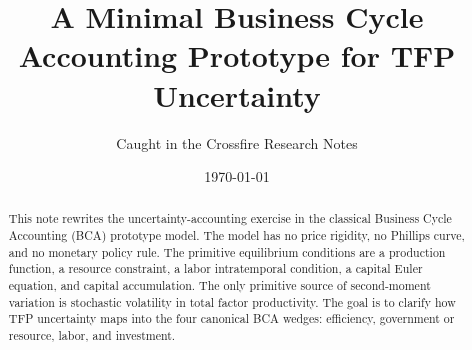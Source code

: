 \documentclass[11pt]{article}
\title{A Minimal Business Cycle Accounting Prototype for TFP Uncertainty}
\author{Caught in the Crossfire Research Notes}
\date{\today}
\begin{document}
\maketitle

\begin{abstract}
This note rewrites the uncertainty-accounting exercise in the classical
Business Cycle Accounting (BCA) prototype model. The model has no price
rigidity, no Phillips curve, and no monetary policy rule. The primitive
equilibrium conditions are a production function, a resource constraint, a
labor intratemporal condition, a capital Euler equation, and capital
accumulation. The only primitive source of second-moment variation is stochastic
volatility in total factor productivity. The goal is to clarify how TFP
uncertainty maps into the four canonical BCA wedges: efficiency, government or
resource, labor, and investment.
\end{abstract}

\tableofcontents

\clearpage










\appendix

\end{document}

